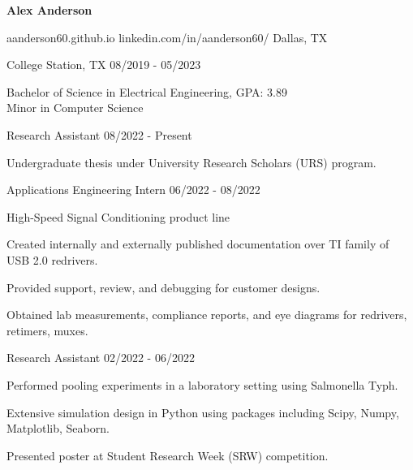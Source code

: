 \documentclass[11pt]{article}
\begin{document}
\centerline{{\Huge \bf Alex Anderson}}

\bigskip

        {aanderson60.github.io}
        {linkedin.com/in/aanderson60/}
        {Dallas, TX}


\begin{description}
\squish
{}
            {College Station, TX}
            {08/2019 - 05/2023}

Bachelor of Science in Electrical Engineering, GPA: 3.89 \\
Minor in Computer Science

\end{description}


\begin{description}
\squish
{}
            {Research Assistant}
            {08/2022 - Present}

Undergraduate thesis under University Research Scholars (URS) program.



\end{description}

\begin{description}
\squish
{}
            {Applications Engineering Intern}
            {06/2022 - 08/2022}

High-Speed Signal Conditioning product line

Created internally and externally published documentation over TI family of USB 2.0 redrivers.

Provided support, review, and debugging for customer designs. 

Obtained lab measurements, compliance reports, and eye diagrams for redrivers, retimers, muxes.
      
\end{description}

\begin{description}
\squish
{}
            {Research Assistant}
            {02/2022 - 06/2022}

Performed pooling experiments in a laboratory setting using Salmonella Typh.

Extensive simulation design in Python using packages including Scipy, Numpy, Matplotlib, Seaborn.

Presented poster at Student Research Week (SRW) competition.

\end{description}
\end{document}
